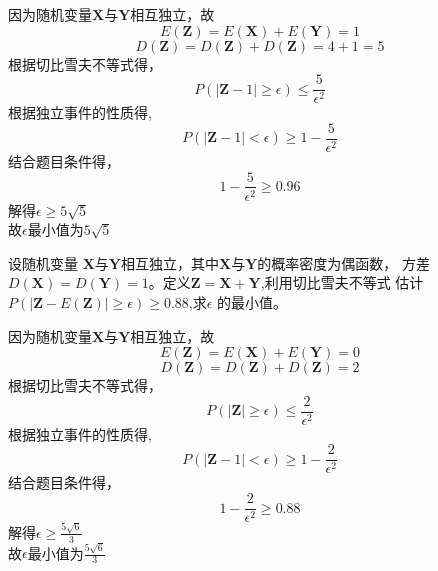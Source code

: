 \begin{solution}
    因为随机变量\(\bm{X}\)与\(\bm{Y}\)相互独立，故
    \[E(\bm{Z}) =E(\bm{X}) +E(\bm{Y})=1\]
    \[D(\bm{Z}) =D(\bm{Z})+D(\bm{Z})=4+1=5\]
    根据切比雪夫不等式得，
    \[P(\vert \bm{Z}- 1\vert \geq \epsilon) \leq \frac{5}{\epsilon^2}\]
    根据独立事件的性质得,
    \[P(\vert \bm{Z}- 1\vert < \epsilon) \geq 1-\frac{5}{\epsilon^2}\]
    结合题目条件得，
    \[1 - \frac{5}{\epsilon^2} \geq 0.96\]
    解得\(\epsilon \geq 5\sqrt{5}\)\\
    故\(\epsilon\)最小值为\(5\sqrt{5}\)
\end{solution}
\begin{question}
    设随机变量 \(\bm{X}\)与\(\bm{Y}\)相互独立，其中\(\bm{X}\)与\(\bm{Y}\)的概率密度为偶函数，
    方差\(D(\bm{X}) =D(\bm{Y}) = 1\)。定义\(\bm{Z} = \bm{X}+\bm{Y}\),利用切比雪夫不等式
    估计\(P(\vert \bm{Z}-E(\bm{Z})\vert \geq \epsilon )\geq 0.88\),求\(\epsilon\)
    的最小值。
\end{question}
\begin{solution}
    因为随机变量\(\bm{X}\)与\(\bm{Y}\)相互独立，故
    \[E(\bm{Z}) =E(\bm{X}) +E(\bm{Y})=0\]
    \[D(\bm{Z}) =D(\bm{Z})+D(\bm{Z})=2\]
    根据切比雪夫不等式得，
    \[P(\vert \bm{Z}\vert \geq \epsilon) \leq \frac{2}{\epsilon^2}\]
    根据独立事件的性质得,
    \[P(\vert \bm{Z}- 1\vert < \epsilon) \geq 1-\frac{2}{\epsilon^2}\]
    结合题目条件得，
    \[1 - \frac{2}{\epsilon^2} \geq 0.88\]
    解得\(\epsilon \geq \frac{5\sqrt{6}}{3}\)\\
    故\(\epsilon\)最小值为\(\frac{5\sqrt{6}}{3}\)
\end{solution}
